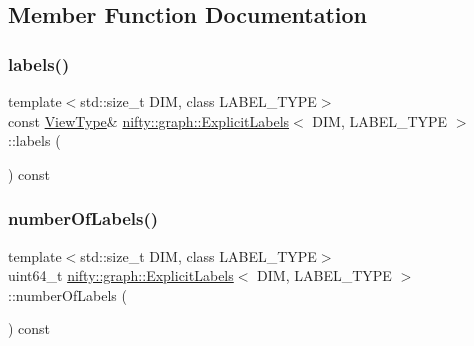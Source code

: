 \subsection{Member Function Documentation}
\mbox{\label{classnifty_1_1graph_1_1ExplicitLabels_a8ca813486933212330c6053129cb4758}} 
\subsubsection{\texorpdfstring{labels()}{labels()}}
{\footnotesize\ttfamily template$<$std\+::size\+\_\+t D\+IM, class L\+A\+B\+E\+L\+\_\+\+T\+Y\+PE$>$ \\
const \hyperlink{classnifty_1_1graph_1_1ExplicitLabels_aaab98314403b95503bf0c32e65fd1884}{View\+Type}\& \hyperlink{classnifty_1_1graph_1_1ExplicitLabels}{nifty\+::graph\+::\+Explicit\+Labels}$<$ D\+IM, L\+A\+B\+E\+L\+\_\+\+T\+Y\+PE $>$\+::labels (\begin{DoxyParamCaption}{ }\end{DoxyParamCaption}) const\hspace{0.3cm}{\ttfamily [inline]}}

\mbox{\label{classnifty_1_1graph_1_1ExplicitLabels_ab34ace7ac75307c3ae7e1ffc70e4e9eb}} 
\subsubsection{\texorpdfstring{number\+Of\+Labels()}{numberOfLabels()}}
{\footnotesize\ttfamily template$<$std\+::size\+\_\+t D\+IM, class L\+A\+B\+E\+L\+\_\+\+T\+Y\+PE$>$ \\
uint64\+\_\+t \hyperlink{classnifty_1_1graph_1_1ExplicitLabels}{nifty\+::graph\+::\+Explicit\+Labels}$<$ D\+IM, L\+A\+B\+E\+L\+\_\+\+T\+Y\+PE $>$\+::number\+Of\+Labels (\begin{DoxyParamCaption}{ }\end{DoxyParamCaption}) const\hspace{0.3cm}{\ttfamily [inline]}}

